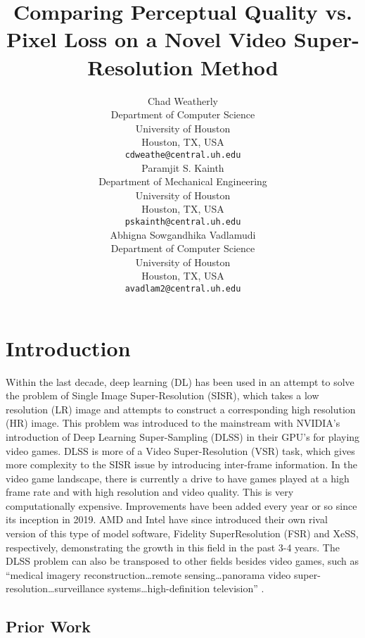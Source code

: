 \documentclass{article}
\title{Comparing Perceptual Quality vs. Pixel Loss on a Novel Video Super-Resolution Method}
\author{
  Chad Weatherly \\
  Department of Computer Science \\
  University of Houston \\
  Houston, TX, USA \\
  \texttt{cdweathe@central.uh.edu} \\
  \And
  Paramjit S. Kainth \\
  Department of Mechanical Engineering \\
  University of Houston \\
  Houston, TX, USA \\
  \texttt{pskainth@central.uh.edu} \\
  \And
  Abhigna Sowgandhika Vadlamudi \\
  Department of Computer Science \\
  University of Houston \\
  Houston, TX, USA \\
  \texttt{avadlam2@central.uh.edu} \\
}
\begin{document}
\maketitle


\section{Introduction}

 Within the last decade, deep learning (DL) has been used in an attempt to solve the problem of Single Image Super-Resolution (SISR), which takes a low resolution (LR) image and attempts to construct a corresponding high resolution (HR) image. This problem was introduced to the mainstream with NVIDIA’s introduction of Deep Learning Super-Sampling (DLSS) in their GPU’s for playing video games. DLSS is more of a Video Super-Resolution (VSR) task, which gives more complexity to the SISR issue by introducing inter-frame information. In the video game landscape, there is currently a drive to have games played at a high frame rate and with high resolution and video quality. This is very computationally expensive. Improvements have been added every year or so since its inception in 2019. AMD and Intel have since introduced their own rival version of this type of model software, Fidelity SuperResolution (FSR) and XeSS, respectively, demonstrating the growth in this field in the past 3-4 years. The DLSS problem can also be transposed to other fields besides video games, such as “medical imagery reconstruction…remote sensing…panorama video super-resolution…surveillance systems…high-definition television” \cite{liu_video_2022}. \\ %

\subsection{Prior Work}
 
\end{document}

